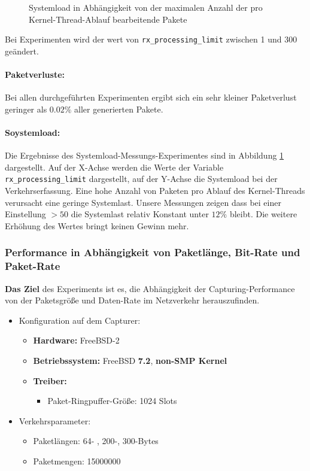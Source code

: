 {\begin{figure}
\caption{Systemload in Abhängigkeit von der maximalen Anzahl der pro Kernel-Thread-Ablauf
bearbeitende Pakete}
\label{img:plot_sysload_kts}
\end{figure} 
Bei Experimenten wird der wert von \verb+rx_processing_limit+ zwischen 1 und 300 
geändert.
\paragraph*{Paketverluste:} 
Bei allen durchgeführten Experimenten ergibt sich ein sehr kleiner Paketverlust
geringer als $0.02\%$ aller generierten Pakete.
\paragraph*{Soystemload:}
Die Ergebnisse des Systemload-Messungs-Experimentes sind in Abbildung
\ref{img:plot_sysload_kts} dargestellt.  Auf der X-Achse werden die Werte der
Variable \verb+rx_processing_limit+ dargestellt, auf der Y-Achse die Systemload
bei der Verkehrserfassung. Eine hohe Anzahl von Paketen pro Ablauf des
Kernel-Threads verursacht eine geringe Systemlast. Unsere Messungen zeigen dass
bei einer Einstellung $>50$ die Systemlast relativ Konstant unter $12\%$ bleibt. 
Die weitere Erhöhung des Wertes bringt keinen Gewinn mehr.
}
\subsubsection*{Performance in Abhängigkeit von Paketlänge, Bit-Rate und Paket-Rate}
\textbf{Das Ziel} des Experiments ist es, die Abhängigkeit der
Capturing-Performance von der Paketsgröße und Daten-Rate im Netzverkehr
herauszufinden.
%
\begin{itemize}
\item Konfiguration auf dem Capturer: 
\begin{itemize}
	\item \textbf{Hardware:} FreeBSD-2
	\item \textbf{Betriebssystem:} FreeBSD \textbf{7.2}, \textbf{non-SMP Kernel}
	\item \textbf{Treiber:} 
		\begin{itemize}
			\item Paket-Ringpuffer-Größe: 1024 Slots
		\end{itemize}
\end{itemize}
\item Verkehrsparameter:
\begin{itemize}
	\item Paketlängen: 64- , 200-, 300-Bytes
	\item Paketmengen: 15000000
\end{itemize}
\end{itemize}
%
